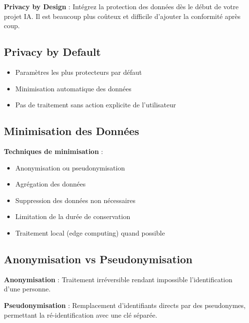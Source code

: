\documentclass[11pt,a4paper]{article}
\begin{document}
\begin{tipbox}
\textbf{Privacy by Design} : Intégrez la protection des données dès le début de votre projet IA. Il est beaucoup plus coûteux et difficile d'ajouter la conformité après coup.
\end{tipbox}

\subsection{Privacy by Default}

\begin{itemize}
    \item Paramètres les plus protecteurs par défaut
    \item Minimisation automatique des données
    \item Pas de traitement sans action explicite de l'utilisateur
\end{itemize}

\subsection{Minimisation des Données}

\begin{tipbox}
\textbf{Techniques de minimisation} :
\begin{itemize}
    \item Anonymisation ou pseudonymisation
    \item Agrégation des données
    \item Suppression des données non nécessaires
    \item Limitation de la durée de conservation
    \item Traitement local (edge computing) quand possible
\end{itemize}
\end{tipbox}

\subsection{Anonymisation vs Pseudonymisation}

\begin{definitionbox}
\textbf{Anonymisation} : Traitement irréversible rendant impossible l'identification d'une personne.
\end{definitionbox}

\begin{definitionbox}
\textbf{Pseudonymisation} : Remplacement d'identifiants directs par des pseudonymes, permettant la ré-identification avec une clé séparée.
\end{definitionbox}
\end{document}
